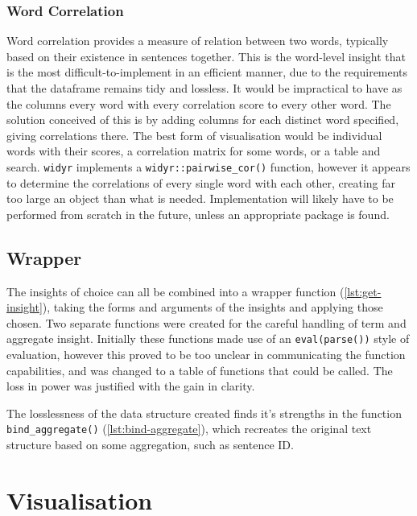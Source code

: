 \message{ !name(jason-cairns-dissertation.tex)}\documentclass[11pt, a4paper, titlepage]{report}
\begin{document}
\subsubsection{Word Correlation}\label{sec:word-correlation}

Word correlation provides a measure of relation between two words,
typically based on their existence in sentences together. This is the
word-level insight that is the most difficult-to-implement in an
efficient manner, due to the requirements that the dataframe remains
tidy and lossless. It would be impractical to have as the columns
every word with every correlation score to every other word. The
solution conceived of this is by adding columns for each distinct word
specified, giving correlations there. The best form of visualisation
would be individual words with their scores, a correlation matrix for
some words, or a table and search. \texttt{widyr} implements a
\texttt{widyr::pairwise_cor()} function, however it appears to
determine the correlations of every single word with each other,
creating far too large an object than what is
needed\autocite{robinson19:widyr}. Implementation will likely have to
be performed from scratch in the future, unless an appropriate package
is found.

\subsection{Wrapper}\label{sec:wrapper}

The insights of choice can all be combined into a wrapper function
(\cref{lst:get-insight}), taking the forms and arguments of the
insights and applying those chosen. Two separate functions were
created for the careful handling of term and aggregate insight.
Initially these functions made use of an \texttt{eval(parse())}
style of evaluation, however this proved to be too unclear in
communicating the function capabilities, and was changed to a table of
functions that could be called. The loss in power was justified with
the gain in clarity.

The losslessness of the data structure created finds it's strengths in
the function \texttt{bind_aggregate()}
(\cref{lst:bind-aggregate}), which recreates the original
text structure based on some aggregation, such as sentence ID.\

\section{Visualisation}\label{sec:visualisation}
\end{document}
